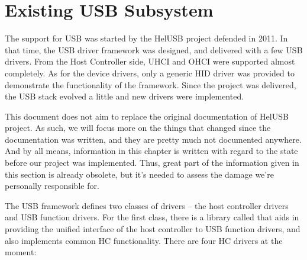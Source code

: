 

\section{Existing USB Subsystem}

The support for USB was started by the HelUSB project defended in 2011. In that
time, the USB driver framework was designed, and delivered with a few USB
drivers. From the Host Controller side, UHCI and OHCI were supported almost
completely. As for the device drivers, only a generic HID driver was provided
to demonstrate the functionality of the framework. Since the project was
delivered, the USB stack evolved a little and new drivers were implemented.

This document does not aim to replace the original documentation of HelUSB
project. As such, we will focus more on the things that changed since the
documentation was written, and they are pretty much not documented anywhere.
And by all means, information in this chapter is written with regard to the
state before our project was implemented. Thus, great part of the information
given in this section is already obsolete, but it's needed to assess the damage
we're personally responsible for.

The USB framework defines two classes of drivers -- the host controller drivers
and USB function drivers. For the first class, there is a library called
 that aids in providing the unified interface of the host
controller to USB function drivers, and also implements common HC
functionality. There are four HC drivers at the moment:

